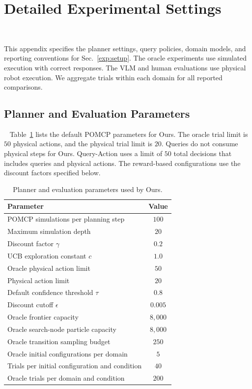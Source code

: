 \section{Detailed Experimental Settings}~\label{appx:settings}

This appendix specifies the planner settings, query policies, domain models, and reporting conventions for Sec.~\ref{exp:setup}. The oracle experiments use simulated execution with correct responses. The VLM and human evaluations use physical robot execution. We aggregate trials within each domain for all reported comparisons.

\subsection{Planner and Evaluation Parameters}~\label{appx:planner_params}
Table~\ref{tab:app_planner_params} lists the default POMCP parameters for Ours. The oracle trial limit is $50$ physical actions, and the physical trial limit is $20$. Queries do not consume physical steps for Ours. Query-Action uses a limit of $50$ total decisions that includes queries and physical actions. The reward-based configurations use the discount factors specified below.

\begin{table}[!htbp]
\centering
\caption{Planner and evaluation parameters used by Ours.}
\label{tab:app_planner_params}
\small
\begin{tabular}{lc}
\toprule
\textbf{Parameter} & \textbf{Value} \\
\midrule
POMCP simulations per planning step & $100$ \\
Maximum simulation depth & $20$ \\
Discount factor $\gamma$ & $0.2$ \\
UCB exploration constant $c$ & $1.0$ \\
Oracle physical action limit & $50$ \\
Physical action limit & $20$ \\
Default confidence threshold $\tau$ & $0.8$ \\
Discount cutoff $\epsilon$ & $0.005$ \\
Oracle frontier capacity & $8{,}000$ \\
Oracle search-node particle capacity & $8{,}000$ \\
Oracle transition sampling budget & $250$ \\
Oracle initial configurations per domain & $5$ \\
Trials per initial configuration and condition & $40$ \\
Oracle trials per domain and condition & $200$ \\
\bottomrule
\end{tabular}
\end{table}

